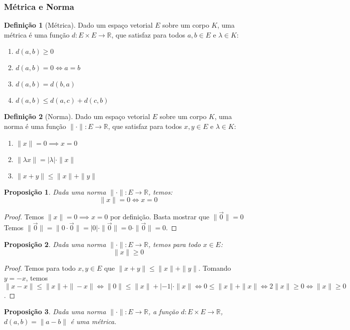 \documentclass{article}
\theoremstyle{plain}
\newtheorem{prop}{Proposição}[section]
\theoremstyle{definition}
\newtheorem{definicao}{Definição}[section]
\theoremstyle{remark}
\begin{document}
\subsubsection{Métrica e Norma}
\begin{definicao}[Métrica]
	Dado um espaço vetorial $E$ sobre um corpo $K$, uma métrica é uma função $d: E\times E \to \mathbb{R}$, que satisfaz para todos $a,b\in E$ e $\lambda \in K$:
	\begin{enumerate}
		\item $d(a,b) \geq 0$
		\item $d(a,b) = 0 \iff a = b $
		\item $d(a,b) = d(b,a)$
		\item $ d(a,b) \leq d(a,c) + d(c,b)$
	\end{enumerate}
\end{definicao}
\begin{definicao}[Norma]
	Dado um espaço vetorial $E$ sobre um corpo $K$, uma norma é uma função $\| \cdot \|: E \to \mathbb{R}$, que satisfaz para todos $x,y\in E$ e $\lambda \in K$:

	\begin{enumerate}
		\item $\| x \| = 0 \implies x = 0 $
		\item $\| \lambda x \| = | \lambda | \cdot \| x \|$
		\item $ \| x+y \| \leq \| x \| + \| y \|$
	\end{enumerate}
\end{definicao}
\begin{prop}
	Dada uma norma $\| \cdot \|: E \to \mathbb{R}$, temos:
	$$ \| x\| = 0 \iff x = 0 $$
\end{prop}
\begin{proof}
	Temos $\| x \| =0 \implies x = 0$ por definição. Basta mostrar que $\| \vec{0} \| = 0 $
	Temos $\| \vec{0} \| = \| 0 \cdot \vec{0} \|  = |0| \cdot \| \vec{0} \| = 0 \cdot \|\vec{0} \| = 0$.
\end{proof}
\begin{prop}
	Dada uma norma $\| \cdot \|: E \to \mathbb{R}$, temos para todo $x\in E$:
	$$ \|x \| \geq 0 $$
\end{prop}
\begin{proof}
	Temos para todo $x,y \in E$ que $\| x+y\| \leq \|x \| + \| y \|$.  Tomando $y = - x$, temos $\| x-x\| \leq \| x\| + \| -x\| \iff \|0 \| \leq \|x\| + |-1| \cdot \| x\| \iff 0 \leq \|x\| + \|x\| \iff 2\|x\| \geq 0 \iff \|x\| \geq 0$.
\end{proof}
\begin{prop}
	Dada uma norma $\| \cdot \|: E \to \mathbb{R}$, a função $d: E\times E \to \mathbb{R}$, $d(a,b) = \| a-b\|$ é uma métrica.
\end{prop}
\end{document}
